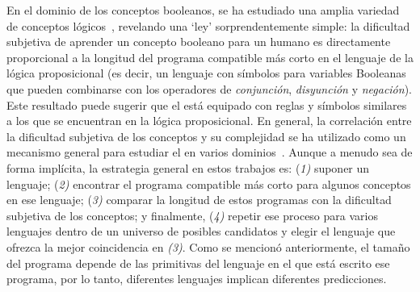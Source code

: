 
En el dominio de los conceptos booleanos, se ha estudiado una amplia variedad de conceptos lógicos~\cite{feldman2003simplicity}, revelando una `ley' sorprendentemente simple: la dificultad subjetiva de aprender un concepto booleano para un humano es directamente proporcional a la longitud del programa compatible más corto en el lenguaje de la lógica proposicional (es decir, un lenguaje con símbolos para variables Booleanas que pueden combinarse con los operadores de \textit{conjunción}, \textit{disyunción} y \textit{negación}). Este resultado puede sugerir que el \lot está equipado con reglas y símbolos similares a los que se encuentran en la lógica proposicional. En general, la correlación entre la dificultad subjetiva de los conceptos y su complejidad se ha utilizado como un mecanismo general para estudiar el \lot en varios dominios~\cite{piantadosi2016logical,leeuwenberg1971perceptual,amalric2017language,romano2018bayesian,lupyan2007language}. Aunque a menudo sea de forma implícita, la estrategia general en estos trabajos es: (\textit{1)} suponer un lenguaje; (\textit{2)} encontrar el programa compatible más corto para algunos conceptos en ese lenguaje; (\textit{3)} comparar la longitud de estos programas con la dificultad subjetiva de los conceptos; y finalmente, (\textit{4)} repetir ese proceso para varios lenguajes dentro de un universo de posibles candidatos y elegir el lenguaje que ofrezca la mejor coincidencia en \textit{(3)}. Como se mencionó anteriormente, el tamaño del programa depende de las primitivas del lenguaje en el que está escrito ese programa, por lo tanto, diferentes lenguajes implican diferentes predicciones.

